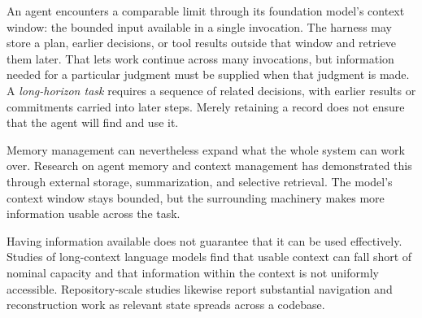 

An agent encounters a comparable limit through its foundation model's context window: the bounded input available in a single invocation. The harness may store a plan, earlier decisions, or tool results outside that window and retrieve them later. That lets work continue across many invocations, but information needed for a particular judgment must be supplied when that judgment is made. A \emph{long-horizon task} requires a sequence of related decisions, with earlier results or commitments carried into later steps. Merely retaining a record does not ensure that the agent will find and use it.

Memory management can nevertheless expand what the whole system can work over. Research on agent memory and context management has demonstrated this through external storage, summarization, and selective retrieval\citep{packer2023memgpt}\citep{lee2024readagent}. The model's context window stays bounded, but the surrounding machinery makes more information usable across the task.


Having information available does not guarantee that it can be used effectively. Studies of long-context language models find that usable context can fall short of nominal capacity and that information within the context is not uniformly accessible\citep{hsieh2024ruler}\citep{liu2024lostmiddle}. Repository-scale studies likewise report substantial navigation and reconstruction work as relevant state spreads across a codebase\citep{sourcegraph2026largecodebase}.


